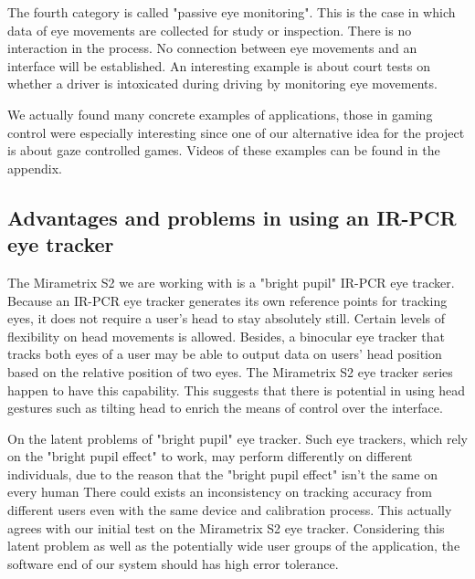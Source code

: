 \documentclass[english]{tktltiki}
\begin{document}
The fourth category is called "passive eye monitoring". This is the case in which data of eye movements are collected for study or inspection. There is no interaction in the process. No connection between eye movements and an interface will be established. An interesting example is about court tests on whether a driver is intoxicated during driving by monitoring eye movements\cite{Busloff1993}.

We actually found many concrete examples of applications, those in gaming control were especially interesting since one of our alternative idea for the project is about gaze controlled games. Videos of these examples can be found in the appendix. 

\subsection{Advantages and problems in using an IR-PCR eye tracker}

The Mirametrix S2 we are working with is a "bright pupil" IR-PCR eye tracker. Because an IR-PCR eye tracker generates its own reference points for tracking eyes, it does not require a user's head to stay absolutely still. Certain levels of flexibility on head movements is allowed. Besides, a binocular eye tracker that tracks both eyes of a user may be able to output data on users' head position based on the relative position of two eyes. The Mirametrix S2 eye tracker series happen to have this capability. This suggests that there is potential in using head gestures such as tilting head to enrich the means of control over the interface. 

On the latent problems of "bright pupil" eye tracker. Such eye trackers, which rely on the "bright pupil effect" to work, may perform differently on different individuals, due to the reason that the "bright pupil effect" isn't the same on every human \cite{Nguyen:2002:DIB:507072.507099} There could exists an inconsistency on tracking accuracy from different users even with the same device and calibration process. This actually agrees with our initial test on the Mirametrix S2 eye tracker. Considering this latent problem as well as the potentially wide user groups of the application, the software end of our system should has high error tolerance.
\end{document}
